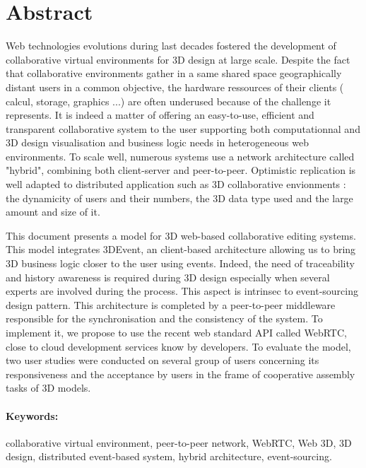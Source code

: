 \section*{Abstract}

Web technologies evolutions during last decades fostered the development of 
collaborative virtual environments for 3D design at large scale. Despite the fact 
that collaborative environments gather in a same shared space geographically 
distant users in a common objective, the hardware ressources of their clients (
calcul, storage, graphics ...) are often underused because of the challenge it 
represents. It is indeed a matter of offering an easy-to-use, efficient and 
transparent collaborative system to the user supporting both computationnal and 
3D 
design visualisation and business logic needs in heterogeneous web 
environments. 
To scale well, numerous systems use a network architecture called "hybrid",  
combining both client-server and peer-to-peer. Optimistic 
replication is well adapted to distributed application such as 3D collaborative 
envionments : the dynamicity of users and their numbers, the 3D data type 
used and the large amount and size of it.

This document presents a model for 3D web-based collaborative editing systems. 
This model integrates 3DEvent, an client-based architecture allowing us to bring 
3D business logic closer to the user using events. Indeed, the need of traceability 
and history awareness is required during 3D design especially when several 
experts are involved during the process. This aspect is intrinsec to event-sourcing 
design pattern. This architecture is completed by a peer-to-peer middleware 
responsible for the synchronisation and the consistency of the system. To 
implement it, we propose to use the recent web standard API called WebRTC, 
close to cloud development services know by developers. To evaluate the model, 
two user studies were conducted on several group of users concerning its 
responsiveness and the acceptance by users in the frame of cooperative 
assembly tasks of 3D models.



\paragraph{Keywords: }collaborative virtual environment, peer-to-peer network, WebRTC, Web 3D, 3D design, distributed event-based system, hybrid architecture, event-sourcing.

\pagebreak